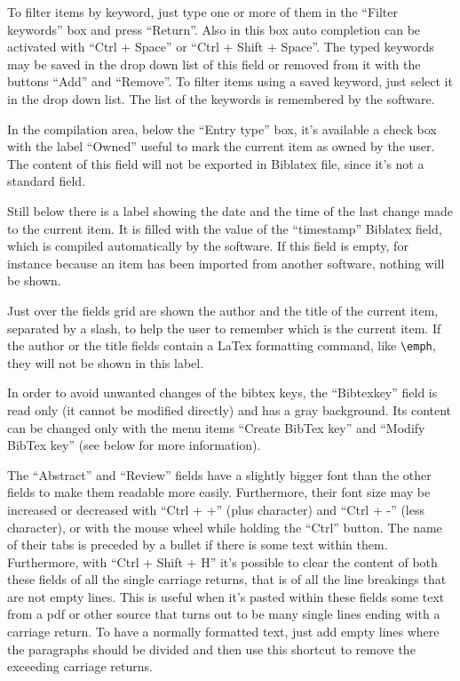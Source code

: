 \documentclass[a4paper,12pt]{report}
\begin{document}
To filter items by keyword, just type one or more of them in the “Filter keywords” box and press “Return”. Also in this box auto completion can be activated with “Ctrl + Space” or “Ctrl + Shift + Space”. The typed keywords may be saved in the drop down list of this field or removed from it with the buttons “Add” and “Remove”. To filter items using a saved keyword, just select it in the drop down list. The list of the keywords is remembered by the software.

In the compilation area, below the “Entry type” box, it's available a check box with the label “Owned” useful to mark the current item as owned by the user. The content of this field will not be exported in Biblatex file, since it's not a standard field.

Still below there is a label showing the date and the time of the last change made to the current item. It is filled with the value of the “timestamp” Biblatex field, which is compiled automatically by the software. If this field is empty, for instance because an item has been imported from another software, nothing will be shown.

Just over the fields grid are shown the author and the title of the current item, separated by a slash, to help the user to remember which is the current item. If the author or the title fields contain a LaTex formatting command, like \texttt{\textbackslash emph{}}, they will not be shown in this label.

In order to avoid unwanted changes of the bibtex keys, the “Bibtexkey” field is read only (it cannot be modified directly) and has a gray background. Its content can be changed only with the menu items “Create BibTex key” and “Modify BibTex key” (see below for more information).

The “Abstract” and “Review” fields have a slightly bigger font than the other fields to make them readable more easily. Furthermore, their font size may be increased or decreased with “Ctrl + +” (plus character) and “Ctrl + -” (less character), or with the mouse wheel while holding the “Ctrl” button. The name of their tabs is preceded by a bullet if there is some text within them. Furthermore, with “Ctrl + Shift + H” it's possible to clear the content of both these fields of all the single carriage returns, that is of all the line breakings that are not empty lines. This is useful when it's pasted within these fields some text from a pdf or other source that turns out to be many single lines ending with a carriage return. To have a normally formatted text, just add empty lines where the paragraphs should be divided and then use this shortcut to remove the exceeding carriage returns.
\end{document}

